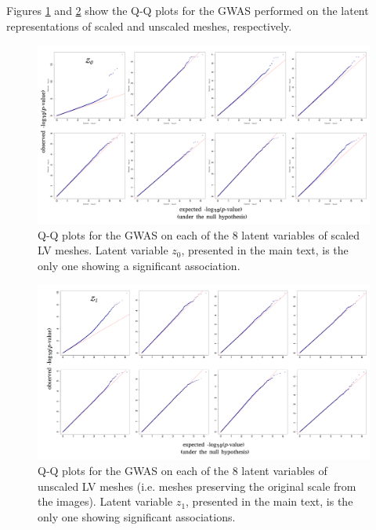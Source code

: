 Figures \ref{fig:qq_scaled} and \ref{fig:qq_unscaled} show the Q-Q plots for the GWAS performed on the latent representations of scaled and unscaled meshes, respectively.

\begin{figure}
 \centering
 \includegraphics[width=\textwidth]{figs/supplementary/scaled_qq.png}
 \caption{Q-Q plots for the GWAS on each of the 8 latent variables of scaled LV meshes. Latent variable $z_0$, presented in the main text, is the only one showing a significant association.}
 \label{fig:qq_scaled}
\end{figure}

\begin{figure}
 \centering
 \includegraphics[width=\textwidth]{figs/supplementary/unscaled_qq.png}
 \caption{Q-Q plots for the GWAS on each of the 8 latent variables of unscaled LV meshes (i.e. meshes preserving the original scale from the images). Latent variable $z_1$, presented in the main text, is the only one showing significant associations.}
 \label{fig:qq_unscaled}
\end{figure}
